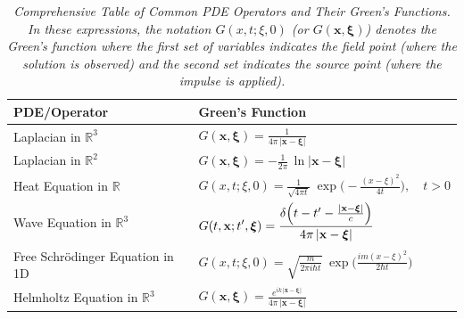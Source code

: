 \begin{table}[H]
\centering
\caption{\textit{Comprehensive Table of Common PDE Operators and Their Green's Functions. In these expressions, the notation \(G(x,t;\xi,0)\) (or \(G(\mathbf{x},\boldsymbol{\xi})\)) denotes the Green's function where the first set of variables indicates the field point (where the solution is observed) and the second set indicates the source point (where the impulse is applied).}}
\begin{tabular}{|>{\centering\arraybackslash}m{}|>{\centering\arraybackslash}m{}|}
\hline
\textbf{PDE/Operator} & \textbf{Green's Function} \\
\hline
\rule{0pt}{6ex}
Laplacian in \(\mathbb{R}^3\) &
\(\displaystyle G(\mathbf{x},\boldsymbol{\xi}) = \frac{1}{4\pi\,\lvert \mathbf{x} - \boldsymbol{\xi} \rvert}\) \\[3ex]
\hline
\rule{0pt}{6ex}
Laplacian in \(\mathbb{R}^2\) &
\(\displaystyle G(\mathbf{x},\boldsymbol{\xi}) = -\frac{1}{2\pi}\,\ln \lvert \mathbf{x} - \boldsymbol{\xi} \rvert\) \\[3ex]
\hline
\rule{0pt}{6ex}
Heat Equation in \(\mathbb{R}\) &
\(\displaystyle G(x,t;\xi,0)=\frac{1}{\sqrt{4\pi t}}\;\exp\!\Biggl(-\frac{(x-\xi)^2}{4t}\Biggr),\quad t>0\) \\[5ex]
\hline
\rule{0pt}{6ex}
Wave Equation in \(\mathbb{R}^3\) &
\(\displaystyle G(t,\mathbf{x};t',\boldsymbol{\xi}) = \frac{\delta\Bigl(t-t'-\frac{\lvert \mathbf{x} - \boldsymbol{\xi} \rvert}{c}\Bigr)}{4\pi\,\lvert \mathbf{x} - \boldsymbol{\xi} \rvert}\) \\[5ex]
\hline
\rule{0pt}{6ex}
Free Schrödinger Equation in 1D &
\(\displaystyle G(x,t;\xi,0)=\sqrt{\frac{m}{2\pi i\hbar t}}\;\exp\Biggl(\frac{i m (x-\xi)^2}{2\hbar t}\Biggr)\) \\[5ex]
\hline
\rule{0pt}{6ex}
Helmholtz Equation in \(\mathbb{R}^3\) &
\(\displaystyle G(\mathbf{x},\boldsymbol{\xi}) = \frac{e^{ik\,\lvert \mathbf{x} - \boldsymbol{\xi} \rvert}}{4\pi\,\lvert \mathbf{x} - \boldsymbol{\xi} \rvert}\) \\[5ex]
\hline
\end{tabular}
\label{table:greens_functions_appendix}
\end{table}

